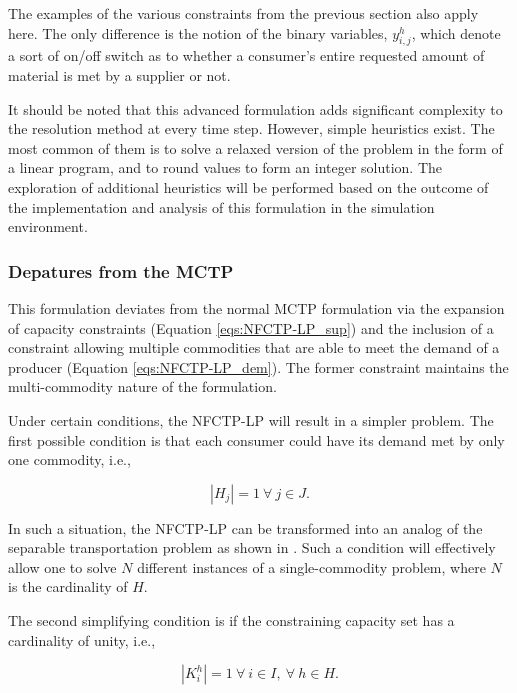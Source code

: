 The examples of the various constraints from the previous section also apply
here. The only difference is the notion of the binary variables, $y_{i,j}^{h}$,
which denote a sort of on/off switch as to whether a consumer's entire requested
amount of material is met by a supplier or not.

It should be noted that this advanced formulation adds significant complexity to
the resolution method at every time step. However, simple heuristics exist. The
most common of them is to solve a relaxed version of the problem in the form of
a linear program, and to round values to form an integer solution. The
exploration of additional heuristics will be performed based on the outcome of
the implementation and analysis of this formulation in the \Cyclus simulation
environment.

\subsubsection{Depatures from the MCTP}

This formulation deviates from the normal MCTP formulation via the expansion of
capacity constraints (Equation \ref{eqs:NFCTP-LP_sup}) and the inclusion of a
constraint allowing multiple commodities that are able to meet the demand of a
producer (Equation \ref{eqs:NFCTP-LP_dem}). The former constraint maintains the
multi-commodity nature of the formulation. 

Under certain conditions, the NFCTP-LP will result in a simpler problem. The
first possible condition is that each consumer could have its demand met by only
one commodity, i.e.,

\begin{equation}\label{eqs:1demand}
  \left|{H_{j}}\right| = 1 \: \forall \: j \in J.
\end{equation}

In such a situation, the NFCTP-LP can be transformed into an analog of the
separable transportation problem as shown in \cite{bertsekas_network_1998}. Such
a condition will effectively allow one to solve $N$ different instances of a
single-commodity problem, where $N$ is the cardinality of $H$. 

The second simplifying condition is if the constraining capacity set has a
cardinality of unity, i.e., 

\begin{equation}\label{eqs:1constraint}
  \left|{K_{i}^{h}}\right| = 1 \: \forall \: i \in I, \: \forall \: h \in H.
\end{equation}

